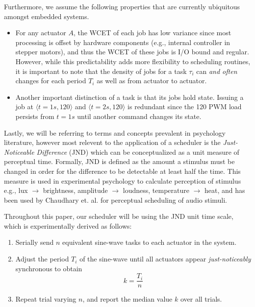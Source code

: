 \documentclass{sigchi}
\begin{document}
  Furthermore, we assume the following properties that are currently ubiquitous amongst embedded systems. 

  \begin{itemize}
  \item For any actuator $A$, the WCET of each job has low variance since most processing is offset by hardware components (e.g., internal controller in stepper motors), and thus the WCET of these jobs is I/O bound and regular. However, while this predictability adds more flexibility to scheduling routines, it is important to note that the density of jobs for a task $\tau_i$ can \textit{and often} changes for each period $T_i$ as well as from actuator to actuator.

  \item Another important distinction of a task is that its jobs hold state. Issuing a job at $\langle t=1s, 120 \rangle$ and $\langle t=2s, 120 \rangle$ is redundant since the 120 PWM load persists from $t=1s$ until another command changes its state.
  \end{itemize}

  Lastly, we will be referring to terms and concepts prevalent in psychology literature, however most relevent to the application of a scheduler is the \textit{Just-Noticeable Difference} (JND) which can be conceptualized as a unit measure of perceptual time. Formally, JND is defined as the amount a stimulus must be changed in order for the difference to be detectable at least half the time. 
  This measure is used in experimental psychology to calculate perception of stimulus e.g., lux $\rightarrow$ brightness, amplitude $\rightarrow$ loudness, temperature $\rightarrow$ heat, and has been used by Chaudhary et. al.\cite{chaudhary_perceptual_2001} for perceptual scheduling of audio stimuli. 

  Throughout this paper, our scheduler will be using the JND unit time scale, which is experimentally derived as follows: 
  \begin{enumerate} 
    \item Serially send $n$ equivalent sine-wave tasks to each actuator in the system.
    \item Adjust the period $T_i$ of the sine-wave until all actuators appear \textit{just-noticeably} synchronous to obtain 
    \begin{equation}
      k = \frac{T_i}{n}
      \label{eq:server_u}
    \end{equation}
    \item Repeat trial varying $n$, and report the median value $k$ over all trials. 
    \  
  \end{enumerate}
\end{document}

